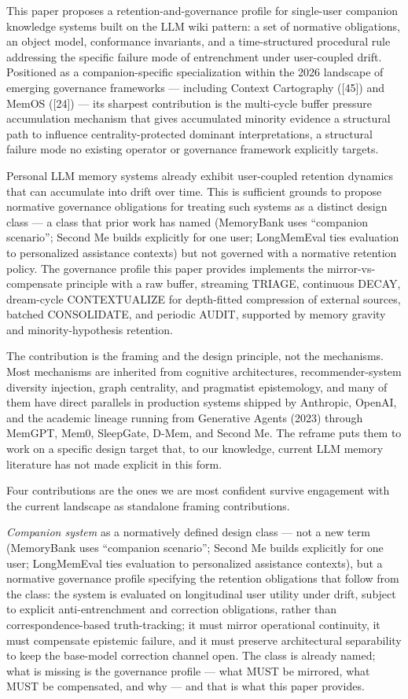 \documentclass[
  11pt,
]{article}
\begin{document}
This paper proposes a retention-and-governance profile for single-user
companion knowledge systems built on the LLM wiki pattern: a set of
normative obligations, an object model, conformance invariants, and a
time-structured procedural rule addressing the specific failure mode of
entrenchment under user-coupled drift. Positioned as a
companion-specific specialization within the 2026 landscape of emerging
governance frameworks --- including Context Cartography ({[}45{]}) and
MemOS ({[}24{]}) --- its sharpest contribution is the multi-cycle buffer
pressure accumulation mechanism that gives accumulated minority evidence
a structural path to influence centrality-protected dominant
interpretations, a structural failure mode no existing operator or
governance framework explicitly targets.

Personal LLM memory systems already exhibit user-coupled retention
dynamics that can accumulate into drift over time. This is sufficient
grounds to propose normative governance obligations for treating such
systems as a distinct design class --- a class that prior work has named
(MemoryBank uses ``companion scenario''; Second Me builds explicitly for
one user; LongMemEval ties evaluation to personalized assistance
contexts) but not governed with a normative retention policy. The
governance profile this paper provides implements the
mirror-vs-compensate principle with a raw buffer, streaming TRIAGE,
continuous DECAY, dream-cycle CONTEXTUALIZE for depth-fitted compression
of external sources, batched CONSOLIDATE, and periodic AUDIT, supported
by memory gravity and minority-hypothesis retention.

The contribution is the framing and the design principle, not the
mechanisms. Most mechanisms are inherited from cognitive architectures,
recommender-system diversity injection, graph centrality, and pragmatist
epistemology, and many of them have direct parallels in production
systems shipped by Anthropic, OpenAI, and the academic lineage running
from Generative Agents (2023) through MemGPT, Mem0, SleepGate, D-Mem,
and Second Me. The reframe puts them to work on a specific design target
that, to our knowledge, current LLM memory literature has not made
explicit in this form.

Four contributions are the ones we are most confident survive engagement
with the current landscape as standalone framing contributions.

\emph{Companion system} as a normatively defined design class --- not a
new term (MemoryBank uses ``companion scenario''; Second Me builds
explicitly for one user; LongMemEval ties evaluation to personalized
assistance contexts), but a normative governance profile specifying the
retention obligations that follow from the class: the system is
evaluated on longitudinal user utility under drift, subject to explicit
anti-entrenchment and correction obligations, rather than
correspondence-based truth-tracking; it must mirror operational
continuity, it must compensate epistemic failure, and it must preserve
architectural separability to keep the base-model correction channel
open. The class is already named; what is missing is the governance
profile --- what MUST be mirrored, what MUST be compensated, and why ---
and that is what this paper provides.
\end{document}
